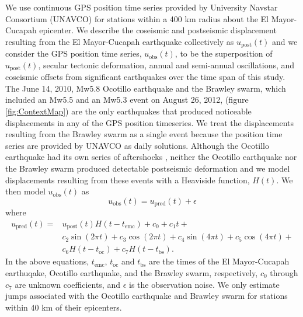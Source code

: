 \documentclass[1p]{elsarticle}
\begin{document}
We use continuous GPS position time series provided by University Navstar Consortium (UNAVCO) for stations within a 400 km radius about the El Mayor-Cucapah epicenter. We describe the coseismic and postseismic displacement resulting from the El Mayor-Cucapah earthquake collectively as $u_\mathrm{post}(t)$ and we consider the GPS position time series, $u_\mathrm{obs}(t)$, to be the superposition of $u_\mathrm{post}(t)$, secular tectonic deformation, annual and semi-annual oscillations, and coseismic offsets from significant earthquakes over the time span of this study.  The June 14, 2010, Mw5.8 Ocotillo earthquake and the Brawley swarm, which included an Mw5.5 and an Mw5.3 event on August 26, 2012, (figure \ref{fig:ContextMap}) are the only earthquakes that produced noticeable displacements in any of the GPS position timeseries.  We treat the displacements resulting from the Brawley swarm as a single event because the position time series are provided by UNAVCO as daily solutions. Although the Ocotillo earthquake had its own series of aftershocks \citep{Hauksson2011}, neither the Ocotillo earthquake nor the Brawley swarm produced detectable postseismic deformation and we model displacements resulting from these events with a Heaviside function, $H(t)$.  We then model $u_\mathrm{obs}(t)$ as 
\begin{equation}
  u_\mathrm{obs}(t) = u_\mathrm{pred}(t) + \epsilon
\end{equation}
where
\begin{equation}\label{TimeSeriesModel}
  \begin{split}  
    u_\mathrm{pred}(t) = &u_\mathrm{post}(t)H(t-t_\mathrm{emc}) + c_0 + c_1t + \\
                         &c_2\sin(2\pi t) + c_3\cos(2\pi t) + c_4\sin(4\pi t) + c_5\cos(4\pi t) + \\
                         &c_6H(t-t_\mathrm{oc}) + c_7H(t-t_\mathrm{bs}).
  \end{split}
\end{equation}
In the above equations, $t_\mathrm{emc}$, $t_\mathrm{oc}$ and $t_\mathrm{bs}$ are the times of the El Mayor-Cucapah earthuqake, Ocotillo earthquake, and the Brawley swarm, respectively, $c_0$ through $c_7$ are unknown coefficients, and $\epsilon$ is the observation noise. We only estimate jumps associated with the Ocotillo earthquake and Brawley swarm for stations within 40 km of their epicenters. 
\end{document}
